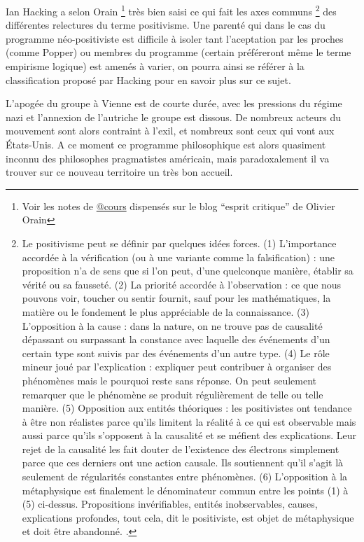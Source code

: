 Ian Hacking \autocite{Hacking1983} a selon Orain \footnote{Voir les notes de \href{http://www.esprit-critique.net/article-12642840.html}{@cours} dispensés sur le blog \enquote{esprit critique} de Olivier Orain} très bien saisi ce qui fait les axes communs \footnote{Le positivisme peut se définir par quelques idées forces. (1) L’importance accordée à la vérification (ou à une variante comme la falsification) : une proposition n’a de sens que si l’on peut, d’une quelconque manière, établir sa vérité ou sa fausseté. (2) La priorité accordée à l’observation : ce que nous pouvons voir, toucher ou sentir fournit, sauf pour les mathématiques, la matière ou le fondement le plus appréciable de la connaissance. (3) L’opposition à la cause : dans la nature, on ne trouve pas de causalité dépassant ou surpassant la constance avec laquelle des événements d’un certain type sont suivis par des événements d’un autre type. (4) Le rôle mineur joué par l’explication : expliquer peut contribuer à organiser des phénomènes mais le pourquoi reste sans réponse. On peut seulement remarquer que le phénomène se produit régulièrement de telle ou telle manière. (5) Opposition aux entités théoriques : les positivistes ont tendance à être non réalistes parce qu’ils limitent la réalité à ce qui est observable mais aussi parce qu’ils s’opposent à la causalité et se méfient des explications. Leur rejet de la causalité les fait douter de l’existence des électrons simplement parce que ces derniers ont une action causale. Ils soutiennent qu’il s’agit là seulement de régularités constantes entre phénomènes. (6) L’opposition à la métaphysique est finalement le dénominateur commun entre les points (1) à (5) ci-dessus. Propositions invérifiables, entités inobservables, causes, explications profondes, tout cela, dit le positiviste, est objet de métaphysique et doit être abandonné. \autocite[82]{Hacking1983}.} des différentes relectures du terme positivisme. Une parenté qui dans le cas du programme néo-positiviste est difficile à isoler tant l'aceptation par les proches (comme Popper) ou membres du programme (certain préféreront même le terme empirisme logique) est amenés à varier, on pourra ainsi se référer à la classification proposé par Hacking pour en savoir plus sur ce sujet. \autocite[81-86]{Hacking1983}

L'apogée du groupe à Vienne est de courte durée, avec les pressions du régime nazi et l'annexion de l'autriche le groupe est dissous. De nombreux acteurs du mouvement sont alors contraint à l'exil, et nombreux sont ceux qui vont aux États-Unis. A ce moment ce programme philosophique est alors quasiment inconnu des philosophes pragmatistes américain, mais paradoxalement il va trouver sur ce nouveau territoire un très bon accueil. 

